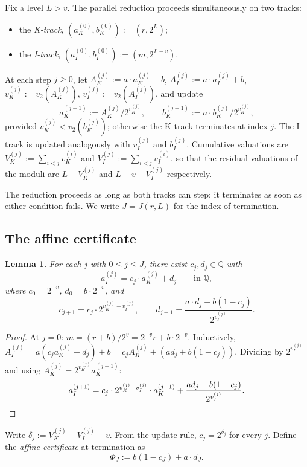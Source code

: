 \documentclass[11pt,reqno]{amsart}
\theoremstyle{plain}
\newtheorem{lemma}[theorem]{Lemma}
\theoremstyle{definition}
\theoremstyle{remark}
\newcommand{\Q}{\mathbb{Q}}
\newcommand{\Vk}{V_{K}}
\newcommand{\Vi}{V_{I}}
\newcommand{\vk}{v_{K}}
\newcommand{\vi}{v_{I}}
\newcommand{\vtwo}{v_{2}}
\begin{document}
Fix a level $L > v$. The parallel reduction proceeds simultaneously on
two tracks:
\begin{itemize}
\item the \emph{K-track}, $(a_K^{(0)}, b_K^{(0)}) := (r, 2^L)$;
\item the \emph{I-track}, $(a_I^{(0)}, b_I^{(0)}) := (m, 2^{L-v})$.
\end{itemize}
At each step $j \ge 0$, let
$A_K^{(j)} := a \cdot a_K^{(j)} + b$, $A_I^{(j)} := a \cdot a_I^{(j)} + b$,
$\vk^{(j)} := \vtwo(A_K^{(j)})$, $\vi^{(j)} := \vtwo(A_I^{(j)})$, and
update
\[
a_K^{(j+1)} := A_K^{(j)}/2^{\vk^{(j)}}, \qquad b_K^{(j+1)} := a \cdot b_K^{(j)}/2^{\vk^{(j)}},
\]
provided $\vk^{(j)} < \vtwo(b_K^{(j)})$; otherwise the K-track terminates
at index $j$. The I-track is updated analogously with $\vi^{(j)}$ and
$b_I^{(j)}$. Cumulative valuations are
$\Vk^{(j)} := \sum_{i<j} \vk^{(i)}$ and
$\Vi^{(j)} := \sum_{i<j} \vi^{(i)}$, so that the residual valuations of
the moduli are $L - \Vk^{(j)}$ and $L - v - \Vi^{(j)}$ respectively.

The reduction proceeds as long as both tracks can step; it terminates as
soon as either condition fails. We write $J = J(r,L)$ for the index of
termination.

\subsection{The affine certificate}

\begin{lemma}\label{lem:affine}
For each $j$ with $0 \le j \le J$, there exist $c_j, d_j \in \Q$ with
\[
a_I^{(j)} = c_j \cdot a_K^{(j)} + d_j \qquad \text{in } \Q,
\]
where $c_0 = 2^{-v}$, $d_0 = b \cdot 2^{-v}$, and
\[
c_{j+1} = c_j \cdot 2^{\vk^{(j)} - \vi^{(j)}},
\qquad
d_{j+1} = \frac{a \cdot d_j + b(1 - c_j)}{2^{\vi^{(j)}}}.
\]
\end{lemma}

\begin{proof}
At $j = 0$: $m = (r+b)/2^v = 2^{-v} r + b \cdot 2^{-v}$. Inductively,
$A_I^{(j)} = a(c_j a_K^{(j)} + d_j) + b = c_j A_K^{(j)} + (a d_j + b(1 - c_j))$.
Dividing by $2^{\vi^{(j)}}$ and using $A_K^{(j)} = 2^{\vk^{(j)}} a_K^{(j+1)}$:
\[
a_I^{(j+1)} = c_j \cdot 2^{\vk^{(j)} - \vi^{(j)}} \cdot a_K^{(j+1)}
            + \frac{a d_j + b(1 - c_j)}{2^{\vi^{(j)}}}. \qedhere
\]
\end{proof}

Write $\delta_j := \Vk^{(j)} - \Vi^{(j)} - v$. From the update rule,
$c_j = 2^{\delta_j}$ for every $j$. Define the \emph{affine certificate}
at termination as
\[
\Phi_J := b(1 - c_J) + a \cdot d_J.
\]
\end{document}
